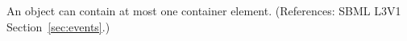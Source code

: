 An \Event object can contain at most one \ListOfEventAssignments
container element. (References: SBML L3V1 Section~\ref{sec:events}.)
